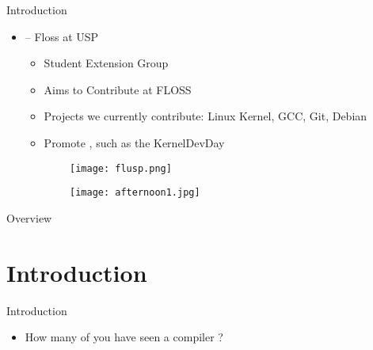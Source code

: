 \customtitlepage



\begin{frame}[fragile]{Introduction}
    \begin{itemize}
        \item {\color{blue}{FLUSP}} -- Floss at USP
            \begin{itemize}
                \item Student Extension Group
                \item Aims to Contribute at FLOSS
                \item Projects we currently contribute: Linux Kernel, GCC, Git, Debian
                \item Promote {\color{blue}{Contribution Events}}, such as the KernelDevDay
            \end{itemize}
    \end{itemize}


\begin{figure}[ht]
\centering
  \begin{subfigure}[b]{0.49\textwidth}
 	\texttt{[image: flusp.png]}
  \end{subfigure}
  \begin{subfigure}[b]{0.49\textwidth}
 	\texttt{[image: afternoon1.jpg]}
  \end{subfigure}
\end{figure}

\end{frame}

\begin{frame}{Overview}
  \overview
\end{frame}

\section{Introduction}


\begin{frame}{Introduction}
    \begin{itemize}
        \item How many of you have seen a compiler {\color{blue}{running in parallel}}?
    \end{itemize}
\end{frame}

